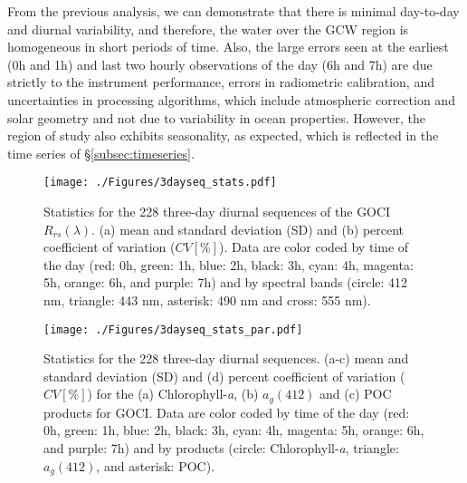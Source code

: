 \documentclass[onecolumn,3p,letterpaper,11pt]{elsarticle}
\begin{document}
From the previous analysis, we can demonstrate that there is minimal day-to-day and diurnal variability, and therefore, the water over the GCW region is homogeneous in short periods of time. Also, the large errors seen at the earliest (0h and 1h) and last two hourly observations of the day (6h and 7h) are due strictly to the instrument performance, errors in radiometric calibration, and uncertainties in processing algorithms, which include atmospheric correction and solar geometry and not due to variability in ocean properties. However, the region of study also exhibits seasonality, as expected, which is reflected in the time series of \S\ref{subsec:timeseries}.
\begin{figure}[H]

\centering
\hspace{-0.8cm}
\texttt{[image: ./Figures/3dayseq\_stats.pdf]}
\caption{Statistics for the 228 three-day diurnal sequences of the GOCI $R_{rs}(\lambda)$. (a) mean and standard deviation (SD) and (b) percent coefficient of variation ($CV[\%]$). Data are color coded by time of the day (red: 0h, green: 1h, blue: 2h, black: 3h, cyan: 4h, magenta: 5h, orange: 6h, and purple: 7h) and by spectral bands (circle: 412 nm, triangle: 443 nm, asterisk: 490 nm and cross: 555 nm).\label{fig:3dayseq_stats} } 
\end{figure}
\begin{figure}[H]
\centering
\hspace{-0.8cm}
\texttt{[image: ./Figures/3dayseq\_stats\_par.pdf]}

\caption{Statistics for the 228 three-day diurnal sequences. (a-c) mean and standard deviation (SD) and (d) percent coefficient of variation ($CV[\%]$) for the (a) Chlorophyll-{\it a}, (b) $a_g(412)$ and (c) POC products for GOCI. Data are color coded by time of the day (red: 0h, green: 1h, blue: 2h, black: 3h, cyan: 4h, magenta: 5h, orange: 6h, and purple: 7h) and by products (circle: Chlorophyll-{\it a}, triangle: $a_g(412)$, and asterisk: POC).\label{fig:3dayseq_stats_par} } 
\end{figure}
\end{document}
